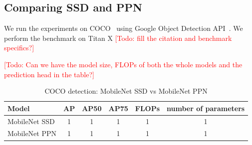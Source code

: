 \documentclass[10pt,twocolumn,letterpaper]{article}
\newcommand{\todo}[1]{\textcolor{red}{[Todo: #1]}}
\begin{document}
\subsection{Comparing SSD and PPN}

We run the experiments on COCO~\cite{coco} using Google
Object Detection API~\cite{api}. We perform the benchmark on
Titan X \todo{fill the citation and benchmark specifics?}

\todo{Can we have the model size, FLOPs of both the whole
models and the prediction head in the table?}


\begin{table}[t]
\begin{center}
\begin{tabular}{l|c|c|c|c|c}
Model & AP & AP50 & AP75 & FLOPs & number of parameters \\
\hline
\hline
MobileNet SSD & 1 & 1 & 1 & 1 & 1 \\
\hline
MobileNet PPN & 1 & 1 & 1 & 1 & 1 \\
\end{tabular}
\end{center}
\caption{COCO detection: MobileNet SSD vs MobileNet PPN}
\end{table}


{\small


}
\end{document}
